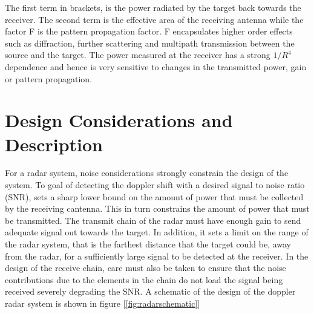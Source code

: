 \documentclass[reprint, aps, prl]{revtex4-1}
\begin{document}
The first term in brackets, is the power radiated by the target back towards the receiver. The second term is the effective area of the receiving antenna while the factor F is the pattern propagation factor. F encapsulates higher order effects such as diffraction, further scattering and multipath transmission between the source and the target. The power measured at the receiver has a strong $1/R^4$ dependence and hence is very sensitive to changes in the transmitted power, gain or pattern propagation.

\section{Design Considerations and Description}
For a radar system, noise considerations strongly constrain the design of the system. To goal of detecting the doppler shift with a desired signal to noise ratio (SNR), sets a sharp lower bound on the amount of power that must be collected by the receiving cantenna. This in turn constrains the amount of power that must be transmitted. The transmit chain of the radar must have enough gain to send adequate signal out towards the target. In addition, it sets a limit on the range of the radar system, that is the farthest distance that the target could be, away from the radar, for a sufficiently large signal to be detected at the receiver. In the design of the receive chain, care must also be taken to ensure that the noise contributions due to the elements in the chain do not load the signal being received severely degrading the SNR. A schematic of the design of the doppler radar system is shown in figure [\ref{fig:radarschematic}]
\end{document}
